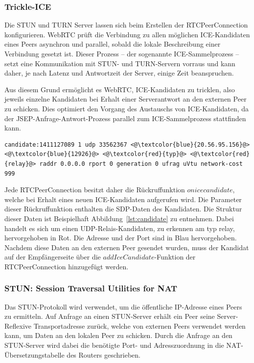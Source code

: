 \subsubsection{Trickle-ICE}
Die \acs{STUN} und \acs{TURN} Server lassen sich beim Erstellen der RTCPeerConnection konfigurieren. \acs{WebRTC} prüft die Verbindung zu allen möglichen \acs{ICE}-Kandidaten eines Peers asynchron und parallel, sobald die lokale Beschreibung einer Verbindung gesetzt ist. Dieser Prozess -- der sogenannte \glqq{}\acs{ICE}-Sammelprozess\grqq{} -- setzt eine Kommunikation mit \acs{STUN}- und \acs{TURN}-Servern vorraus und kann daher, je nach Latenz und Antwortzeit der Server, einige Zeit beanspruchen.\par

Aus diesem Grund ermöglicht es \acs{WebRTC}, \acs{ICE}-Kandidaten zu \glqq{}tricklen\grqq{}, also jeweils einzelne Kandidaten bei Erhalt einer Serverantwort an den externen Peer zu schicken. Dies optimiert den Vorgang des Austauschs von \acs{ICE}-Kandidaten, da der \acs{JSEP}-Anfrage-Antwort-Prozess parallel zum \acs{ICE}-Sammelprozess stattfinden kann.\par

\vspace{1pc}
\lstset{style=STYLE_ICE_CANDIDATE_0}
\begin{lstlisting}[caption={SDP-Datenstring eines Relais-ICE-Kandidaten},captionpos=b,label={lst:candidate}]
candidate:1411127089 1 udp 33562367 <@\textcolor{blue}{20.56.95.156}@> <@\textcolor{blue}{12926}@> <@\textcolor{red}{typ}@> <@\textcolor{red}{relay}@> raddr 0.0.0.0 rport 0 generation 0 ufrag uVtu network-cost 999
\end{lstlisting}

Jede RTCPeerConnection besitzt daher die Rückruffunktion \glqq{}$onicecandidate$\grqq{}, welche bei Erhalt eines neuen \acs{ICE}-Kandidaten aufgerufen wird. Die Parameter dieser Rückruffunktion enthalten die \acs{SDP}-Daten des Kandidaten. Die Struktur dieser Daten ist Beispielhaft Abbildung~\ref{lst:candidate} zu entnehmen. Dabei handelt es sich um einen \acs{UDP}-Relais-Kandidaten, zu erkennen am \glqq{}typ relay\grqq{}, hervorgehoben in Rot. Die Adresse und der Port sind in Blau hervorgehoben. Nachdem diese Daten an den externen Peer gesendet wurden, muss der Kandidat auf der Empfängerseite über die $addIceCandidate$-Funktion der RTCPeerConnection hinzugefügt werden.

\subsubsection{STUN: Session Traversal Utilities for NAT}
Das \acf{STUN}-Protokoll wird verwendet, um die öffentliche \acs{IP}-Adresse eines Peers zu ermitteln. Auf Anfrage an einen STUN-Server erhält ein Peer seine Server-Reflexive Transportadresse zurück, welche von externen Peers verwendet werden kann, um Daten an den lokalen Peer zu schicken. \color{red}Durch die Anfrage an den \acs{STUN}-Server wird dabei die benötigte Port- und Adresszuordnung in die \acs{NAT}-Übersetzungstabelle des Routers geschrieben\color{black}.\par

